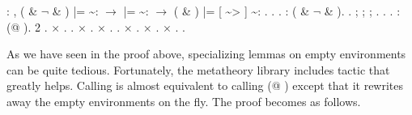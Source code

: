 \documentclass[12pt]{report}
\begin{document}
\begin{coqdoccode}
\coqdocemptyline
\coqdocnoindent
{}  : \coqdockw{\ensuremath{\forall}}       ,\coqdoceol
\coqdocindent{1.00em}
( \&  \ensuremath{\lnot}  \& ) |=  \~{}:  \ensuremath{\rightarrow}\coqdoceol
\coqdocindent{1.00em}
 |=  \~{}:  \ensuremath{\rightarrow}\coqdoceol
\coqdocindent{1.00em}
( \& ) |= [ \~{}> ] \~{}: .\coqdoceol
\coqdocnoindent
{}.\coqdoceol
\coqdocindent{1.00em}
  .  : ( \&  \ensuremath{\lnot}  \& ).  .\coqdoceol
\coqdocindent{1.00em}
 ;   ; ;  .\coqdoceol
\coqdocindent{1.00em}
. \coqdocindent{2.00em}
 . \coqdocindent{3.00em}
 : (@     ).\coqdoceol
\coqdocindent{3.00em}
 2    .\coqdoceol
\coqdocindent{3.00em}
\ensuremath{\times} .\coqdoceol
\coqdocindent{2.00em}
 .\coqdoceol
\coqdocindent{3.00em}
\ensuremath{\times} . \coqdocindent{3.00em}
\ensuremath{\times} . \coqdocindent{1.00em}
   .\coqdoceol
\coqdocindent{1.50em}
\ensuremath{\times} . \ensuremath{\times} .\coqdoceol
\coqdocindent{1.00em}
\ensuremath{\times} .\coqdoceol
\coqdocnoindent
{}.\coqdoceol
\coqdocemptyline
\end{coqdoccode}
As we have seen in the proof above, specializing lemmas 
    on empty environments can be quite tedious. Fortunately,
    the metatheory library includes tactic that greatly helps.
    Calling   is almost equivalent to calling
     (@ ) except that it rewrites away the
    empty environments on the fly. The proof becomes as follows.
\end{document}
